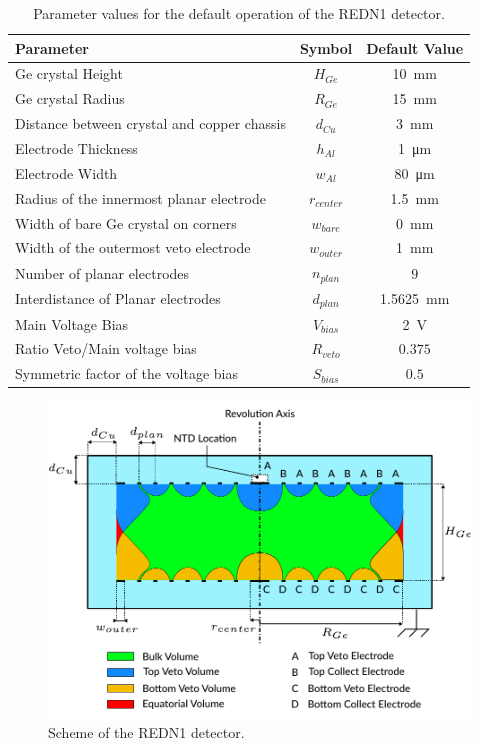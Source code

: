 \begin{table}[]
\centering
\begin{tabular}{l c S}
Parameter                                   & Symbol        & {Default Value} \\ \hline \hline
Ge crystal Height                           & $H_{Ge}$      & \SI{10}{\mm}  \\
Ge crystal Radius                           & $R_{Ge}$      & \SI{15}{\mm}    \\
Distance between crystal and copper chassis & $d_{Cu}$      & \SI{3}{\mm}     \\
Electrode Thickness                         & $h_{Al}$      & \SI{1}{\micro\meter}   \\
Electrode Width                             & $w_{Al}$      & \SI{80}{\micro\meter}  \\
Radius of the innermost planar electrode    & $r_{center}$   & \SI{1.5}{\mm}   \\
Width of bare Ge crystal on corners      & $w_{bare}$    & \SI{0}{\mm}  \\
Width of the outermost veto electrode    & $w_{outer}$    & \SI{1}{\mm}  \\
Number of planar electrodes                 & $n_{plan}$  & {$9$}             \\
Interdistance of Planar electrodes          & $d_{plan}$  & \SI{1.5625}{\mm}  \\
Main Voltage Bias                           & $V_{bias}$    & \SI{2}{\volt}      \\
Ratio Veto/Main voltage bias                & $R_{veto}$    & {$0.375$}         \\
Symmetric factor of the voltage bias        & $S_{bias}$    & {$0.5$}         
\end{tabular}
\caption{Parameter values for the default operation of the REDN1 detector.}
\label{tab:redn1-default-parameters}
\end{table}

\begin{figure}
\centering
\includegraphics[scale=1]{Figures/ElectrodesExperimental/scheme_redn1.pdf}
\caption{Scheme of the REDN1 detector.}
\label{fig:redn1-scheme}
\end{figure}

